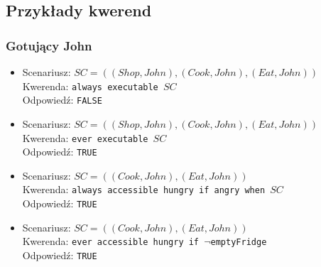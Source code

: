 \documentclass{article}
\begin{document}
\newpage
\subsection{Przykłady kwerend}
\subsubsection{Gotujący John}
\begin{itemize}
\item
Scenariusz: $SC=((Shop,John),(Cook,John),(Eat,John))$\\
Kwerenda: {\large\texttt{always executable $SC$}}\\
Odpowiedź: \texttt{FALSE}
\item
Scenariusz: $SC=((Shop,John),(Cook,John),(Eat,John))$\\
Kwerenda: {\large\texttt{ever executable $SC$}}\\
Odpowiedź: \texttt{TRUE}

\item
Scenariusz: $SC=((Cook,John),(Eat,John))$\\
Kwerenda: {\large\texttt{always accessible hungry if angry when $SC$}}\\
Odpowiedź: \texttt{TRUE}

\item
Scenariusz: $SC=((Cook,John),(Eat,John))$\\
Kwerenda: {\large\texttt{ever accessible hungry if $\neg$emptyFridge}}\\
Odpowiedź: \texttt{TRUE}

\end{itemize}
\end{document}
